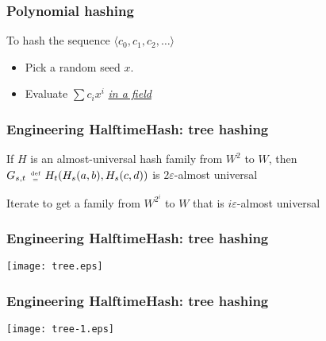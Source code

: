\documentclass[xcolor=dvipsnames]{beamer}
\newcommand{\defeq}{\;\genfrac{}{}{0pt}{2}{\text{def}}{=}\;}
\begin{document}
\begin{frame}
  \frametitle{Polynomial hashing}
  To hash the sequence $\langle c_0, c_1, c_2, \ldots \rangle$
  \pause
  \begin{itemize}
  \item Pick a random seed $x$.
    \pause
  \item Evaluate $\sum c_i x^i$ {\em \underline{in a field}}
  \end{itemize}
\end{frame}

\begin{frame}
  \frametitle{Engineering HalftimeHash: tree hashing}
  If $H$ is an almost-universal hash family from $W^2$ to $W$, then
  $G_{s,t} \defeq H_t(H_s(a, b), H_s(c,d))$ is $2 \varepsilon$-almost universal
  \pause
  
  $ $\\
  Iterate to get a family from  $W^{2^i}$ to $W$ that is $i \varepsilon$-almost universal
\end{frame}


\begin{frame}
  \frametitle{Engineering HalftimeHash: tree hashing}
  \begin{center}
    \texttt{[image: tree.eps]}
  \end{center}
\end{frame}

\begin{frame}
  \frametitle{Engineering HalftimeHash: tree hashing}
  \begin{center}
    \texttt{[image: tree-1.eps]}
  \end{center}
\end{frame}
\end{document}
